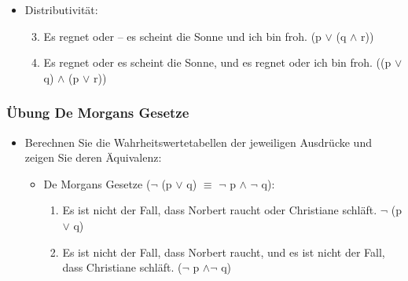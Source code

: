 {\begin{frame}
\begin{itemize}
\begin{itemize}
\begin{enumerate}
			\item Es ist nicht der Fall, dass ich Durst habe, und es ist nicht der Fall, dass ich eine Cola trinke – oder – Es ist der Fall, dass ich Durst habe, und es ist der Fall, dass ich eine Cola trinke. ($\lnot$ p $\wedge$ $\lnot$ q) $\lor$ (p $\wedge$ q)
		\end{enumerate}
	
		\item Distributivität:
	
		\begin{enumerate}\setcounter{enumi}{2}
			\item Es regnet oder -- es scheint die Sonne und ich bin froh. (p  $\lor$ (q $\land$ r))
			
			\item Es regnet oder es scheint die Sonne, und es regnet oder ich bin froh. ((p $\lor$ q) $\land$ (p $\lor$ r))
		\end{enumerate}

	\end{itemize}

\end{itemize}



\end{frame}



\begin{frame}
\frametitle{Übung De Morgans Gesetze}

\begin{itemize}
\item Berechnen Sie die Wahrheitswertetabellen der jeweiligen Ausdrücke und zeigen Sie deren Äquivalenz:

	\begin{itemize}
		\item De Morgans Gesetze ($\lnot$ (p $\lor$ q) $\equiv$ $\lnot$ p $\land$ $\lnot$ q):
	
		\begin{enumerate}
			\item Es ist nicht der Fall, dass Norbert raucht oder Christiane schläft. $\lnot$ (p $\lor$ q)
			
			\item Es ist nicht der Fall, dass Norbert raucht, und es ist nicht der Fall, dass Christiane schläft. ($\lnot$ p $\land \lnot$ q)
		\end{enumerate}
		
	\end{itemize}

\end{itemize}


\end{frame}
}


